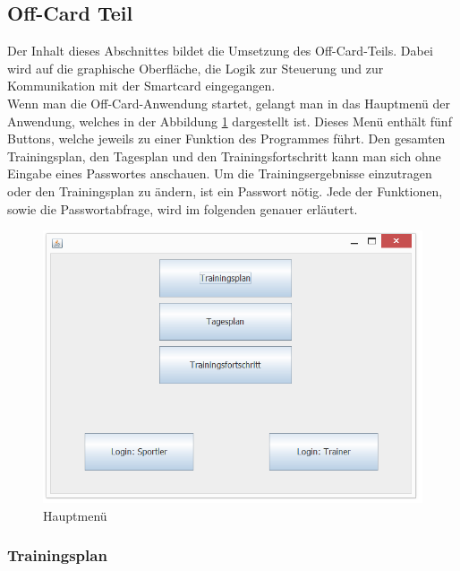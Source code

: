 
\subsection{Off-Card Teil}
\label{subsec:3.3}


Der Inhalt dieses Abschnittes bildet die Umsetzung des Off-Card-Teils. Dabei wird auf die graphische Oberfläche, die Logik zur Steuerung und zur Kommunikation mit der Smartcard eingegangen. \\
\newline
Wenn man die Off-Card-Anwendung startet, gelangt man in das Hauptmenü der Anwendung, welches in der Abbildung \ref{main}  dargestellt ist. Dieses Menü enthält fünf Buttons, welche jeweils zu einer Funktion des Programmes führt. Den gesamten Trainingsplan, den Tagesplan und den Trainingsfortschritt kann man sich ohne Eingabe eines Passwortes anschauen. Um die Trainingsergebnisse einzutragen oder den Trainingsplan zu ändern, ist ein Passwort nötig. Jede der Funktionen, sowie die Passwortabfrage, wird im folgenden genauer erläutert.

\begin{figure}[h]
\includegraphics[width=1\hsize]{./images/main.png}
\caption{Hauptmenü}
\label{main}
\end{figure}

\newpage

\subsubsection*{Trainingsplan}

